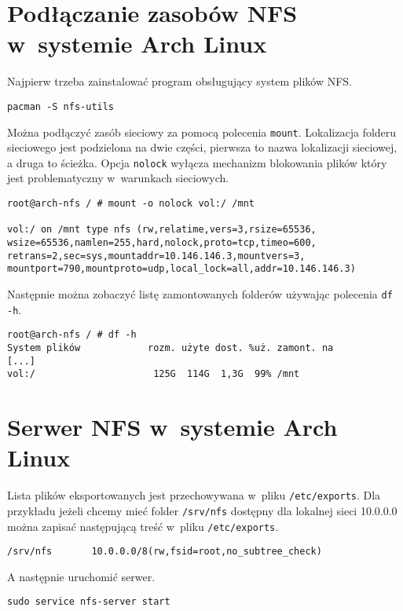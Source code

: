 \documentclass[a4paper,11pt]{article}
\begin{document}
\section{Podłączanie zasobów NFS w~systemie Arch Linux}

Najpierw trzeba zainstalować program obsługujący system plików NFS.

\begin{verbatim}
pacman -S nfs-utils
\end{verbatim}

Można podłączyć zasób sieciowy za pomocą polecenia \verb|mount|.
Lokalizacja folderu sieciowego jest podzielona na dwie części,
pierwsza to nazwa lokalizacji sieciowej, a druga to ścieżka.
Opcja \verb|nolock| wyłącza mechanizm blokowania plików który jest
problematyczny w~warunkach sieciowych.

\begin{verbatim}
root@arch-nfs / # mount -o nolock vol:/ /mnt

vol:/ on /mnt type nfs (rw,relatime,vers=3,rsize=65536,
wsize=65536,namlen=255,hard,nolock,proto=tcp,timeo=600,
retrans=2,sec=sys,mountaddr=10.146.146.3,mountvers=3,
mountport=790,mountproto=udp,local_lock=all,addr=10.146.146.3)
\end{verbatim}

Następnie można zobaczyć listę zamontowanych folderów
używając polecenia \verb|df -h|.

\begin{verbatim}
root@arch-nfs / # df -h
System plików            rozm. użyte dost. %uż. zamont. na
[...]
vol:/                     125G  114G  1,3G  99% /mnt
\end{verbatim}

\section{Serwer NFS w~systemie Arch Linux}

Lista plików eksportowanych jest przechowywana w~pliku \verb|/etc/exports|.
Dla przykładu jeżeli chcemy mieć folder \verb|/srv/nfs| dostępny dla lokalnej
sieci 10.0.0.0 można zapisać następującą treść w~pliku \verb|/etc/exports|.

\begin{verbatim}
/srv/nfs       10.0.0.0/8(rw,fsid=root,no_subtree_check)
\end{verbatim}

A następnie uruchomić serwer.

\begin{verbatim}
sudo service nfs-server start
\end{verbatim}
\end{document}

